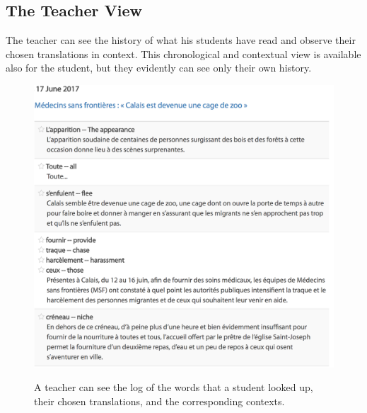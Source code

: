\subsection{The Teacher View}

The teacher can see the history of what his students have read and observe their chosen translations in context. This chronological and contextual view is available also for the student, but they evidently can see only their own history.

\begin{figure}[h!]
\centering
  \includegraphics[width=0.95\columnwidth]{figures/teacher_dashboard.png}
  \caption{A teacher can see the log of the words that a student looked up, their chosen translations, and the corresponding contexts.}{
  \label{exercise_translate}
  }
\end{figure}




